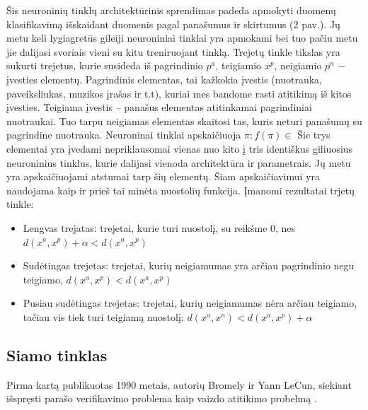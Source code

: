 \documentclass{VUMIFPSkursinis}
\begin{document}
Šis neuroninių tinklų architektūrinis sprendimas padeda apmokyti duomenų klasifikavimą išskaidant duomenis pagal panašumus ir skirtumus (2 pav.). Jų metu keli lygiagretūs gileiji neuroniniai tinklai yra apmokami bei tuo pačiu metu jie dalijasi svoriais vieni su kitu treniruojant tinklą. Trejetų tinkle tikslas yra sukurti trejetus, kurie susideda iš pagrindinio $p^a$, teigiamio $x^p$, neigiamio $p^n$ − įvesties elementų. Pagrindinis elementas, tai kažkokia įvestis (nuotrauka, paveiksliukas, muzikos įrašas ir t.t), kuriai mes bandome rasti atitikimą iš kitos įvesties. Teigiama įvestis – panašus elementas atitinkamai pagrindiniai nuotraukai. Tuo tarpu neigiamas elementas skaitosi tas, kuris neturi panašumų su pagrindine nuotrauka. Neuroninai tinklai apskaičiuoja  $\pi : f(\pi) \in$
Šie trys elementai yra įvedami nepriklausomai vienas nuo kito į  tris identiškus giliuosius neuroninius tinklus, kurie dalijasi vienoda architektūra ir parametrais. Jų metu yra apskaičiuojami atstumai tarp šių elementų. Šiam apskaičiavimui yra naudojama kaip ir prieš tai minėta nuostolių funkcija.
\newline
Įmanomi rezultatai trjetų tinkle:
\begin{itemize}
\item{Lengvas trejatas: trejetai, kurie turi nuostolį, su reikšme 0, nes $d(x^a, x^p) + \alpha < d(x^a, x^p)$}
\item{Sudėtingas trejetas: trejetai, kurių neigiamumas yra arčiau pagrindinio negu teigiamo, $d(x^a, x^p) < d(x^a, x^p)$}
\item{Pusiau sudėtingas trejetas: trejetai, kurių neigiamumas nėra arčiau teigiamo, tačiau vis tiek turi teigiamą nuostolį: $d(x^a, x^n) < d(x^a, x^p) +\alpha$}
\end{itemize}

\subsection{Siamo tinklas}
Pirma kartą publikuotas 1990 metais, autorių Bromely ir Yann LeCun, siekiant išspręsti parašo verifikavimo problema kaip vaizdo atitikimo probelmą \cite{Siamese_signature_verifiction}.
\end{document}
